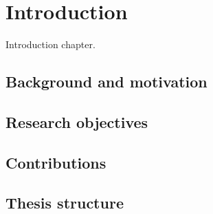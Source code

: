 \graphicspath{{Figures/Introduction}}

\chapter{Introduction}\label{ch:intro}
Introduction chapter.

\section{Background and motivation}\label{intro:sec:background}

\section{Research objectives}\label{intro:sec:objectives}

\section{Contributions}\label{intro:sec:contributions}

\section{Thesis structure}\label{intro:sec:structure}